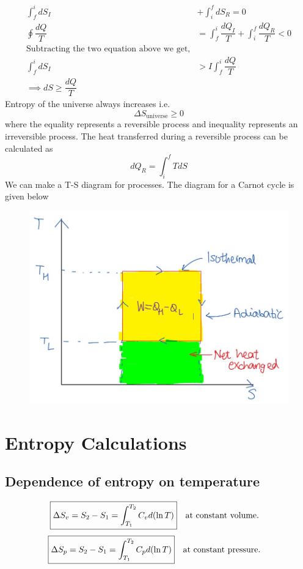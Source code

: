 \documentclass[12pt]{article}
\begin{document}
\begin{align*}
	\int_{f}^{i}dS_I&+\int_{i}^{f}dS_R=0\\
    \oint \dfrac{dQ}{T}&=\int_{f}^{i}\dfrac{dQ_I}{T}+\int_{i}^{f}	\dfrac{dQ_R}{T}<0 \\
\text{Subtracting the two equation above we get,} \\
\int_{f}^{i}dS_I&>{I}\int_{f}^{i}\dfrac{dQ}{T}\\
\implies dS\geq \dfrac{dQ}{T}
\end{align*}
Entropy of the universe always increases i.e. 
\begin{equation}
	\Delta S_{\text{universe}}\geq 0
\end{equation}
where the equality represents a reversible process and inequality represents an irreversible process. The heat transferred during a reversible process can be calculated as 
\begin{equation*}
dQ_R=\int_{i}^{f}TdS
\end{equation*}
We can make a T-S diagram for processes. The diagram for a Carnot cycle is given below
\begin{figure}[h]
	\includegraphics[scale=0.6]{clausius3.jpg}
	\centering
\end{figure}

\section{Entropy Calculations}

\subsection{Dependence of entropy on temperature}
\begin{equation}
	\boxed{\Delta S_v=S_2-S_1=\int_{T_1}^{T_2}C_v d(\ln T)}\qq{at constant volume.}
\end{equation}
\begin{equation}
	\boxed{\Delta S_p=S_2-S_1=\int_{T_1}^{T_2}C_p d(\ln T)}\qq{at constant pressure.}
\end{equation}
\end{document}
